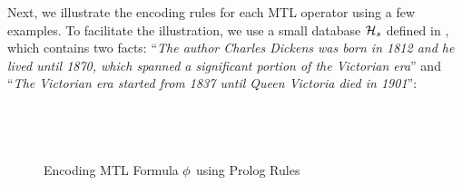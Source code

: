Next, we illustrate the encoding rules for each MTL operator using a few examples. 
To facilitate the illustration, we use a small database $\mathcal{H}_s$ defined in , which contains two facts: ``\emph{The author Charles Dickens was born in 1812 and he lived until 1870, which spanned a significant portion of the Victorian era}'' and ``\emph{The Victorian era started from 1837 until Queen Victoria died in 1901}'': 

\begin{figure}[!b]
\vspace{-3mm}
\centering\small
\begin{gather*} 

\\[0.6em]

\\[0.6em]

\\[0.6em]

\\[0.6em]

\\[0.6em]

\\[0.6em]

\\[0.6em]

\end{gather*}
\caption{Encoding MTL Formula $\phi$ using Prolog Rules}
\label{fig:encoding_rules_mtl}
\end{figure}




